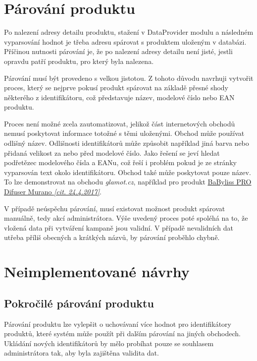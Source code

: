 \documentclass[thesis=B,czech]{FITthesis}[2012/06/26]
\begin{document}
\section{Párování produktu}
Po nalezení adresy detailu produktu, stažení v DataProvider modulu a následném vyparsování hodnot je třeba adresu spárovat s 
produktem uloženým v databázi. Příčinou nutnosti párování je, že po nalezení adresy detailu není jisté, jestli opravdu patří produktu, pro který 
byla nalezena. 
\par
Párování musí být provedeno s velkou jistotou. Z tohoto důvodu navrhuji vytvořit proces, který se nejprve pokusí produkt spárovat na základě
přesné shody některého z identifikátoru, což představuje název, modelové číslo nebo EAN produktu. 
\par
Proces není možné zcela zautomatizovat, jelikož část internetových obchodů nemusí poskytovat informace totožné s těmi uloženými.
Obchod může používat odlišný název. Odlišnosti identifikátorů může způsobit například jiná barva nebo přidaná velikost za nebo před modelové
číslo. Jako řešení se jeví hledat podřetězec modelového čísla a EANu, což řeší i problém pokud je ze stránky vyparsován text okolo
identifikátoru. Obchod také může poskytovat pouze název. To lze demonstrovat na obchodu \textit{glamot.cz}, například
pro produkt 
\href{https://www.glamot.cz/p/19128/difuzer-k-vysouseci-babyliss-pro-difuser-murano}{BaByliss PRO Difuser Murano \textit{[cit. 24.4.2017]}}.
\par
V případě neúspěchu párování, musí existovat možnost produkt spárovat manuálně, tedy akcí administrátora. 
Výše uvedený proces poté spoléhá na to, že vložená data při vytváření kampaně jsou validní. V případě nevalidních dat utřeba
příliš obecných a krátkých názvů, by párování proběhlo chybně.


\section{Neimplementované návrhy}
\subsection{Pokročilé párování produktu}
Párování produktu lze vylepšit o uchovávaní více hodnot pro identifikátory produktů, které systém může použít při dalším 
párování na jiných obchodech. Ukládání nových identifikátorů by mělo probíhat pouze se souhlasem administrátora tak, aby byla zajištěna validita dat.
\end{document}
